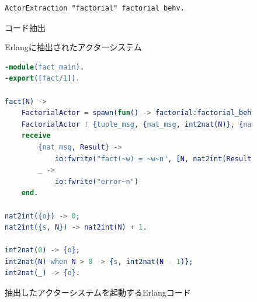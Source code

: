 \begin{figure}[tp]
\begin{lstlisting}
ActorExtraction "factorial" factorial_behv.
\end{lstlisting}
\label{code:overview:extraction}
\caption{コード抽出}
\end{figure}

\begin{figure}
  
  \label{code:overview:fact-impl-erl}
  \caption{Erlangに抽出されたアクターシステム}
\end{figure}

\begin{figure}
\begin{lstlisting}[language=Erlang]
-module(fact_main).
-export([fact/1]).

fact(N) ->
    FactorialActor = spawn(fun() -> factorial:factorial_behv({tt}) end),
    FactorialActor ! {tuple_msg, {nat_msg, int2nat(N)}, {name_msg, self()}},
    receive
        {nat_msg, Result} ->
            io:fwrite("fact(~w) = ~w~n", [N, nat2int(Result)]);
        _ ->
            io:fwrite("error~n")
    end.

nat2int({o}) -> 0;
nat2int({s, N}) -> nat2int(N) + 1.

int2nat(0) -> {o};
int2nat(N) when N > 0 -> {s, int2nat(N - 1)};
int2nat(_) -> {o}.
\end{lstlisting}
\label{code:overview:run}
\caption{抽出したアクターシステムを起動するErlangコード}
\end{figure}
